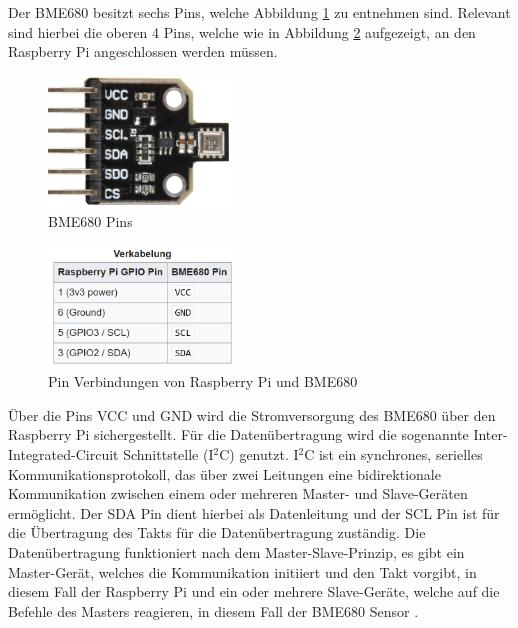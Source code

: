 \documentclass[conference]{IEEEtran}
\begin{document}
Der BME680 besitzt sechs Pins, welche Abbildung \ref{bme_pins} zu entnehmen sind. Relevant sind hierbei die oberen 4 Pins, welche wie in Abbildung \ref{verkabelung_bme} aufgezeigt, an den Raspberry Pi angeschlossen werden müssen. \cite{bme_anschluss}
\begin{figure}[H]
	\centering
	\includegraphics[width=50mm]{fig/bme_pins.png}
	\caption{BME680 Pins}
	\label{bme_pins}
\end{figure}
\begin{figure}[H]
	\centerline{\includegraphics[width=50mm]{fig/verkabelung_bme.png}}
	\caption{Pin Verbindungen von Raspberry Pi und BME680 \cite{bmeAbbildungen}}
	\label{verkabelung_bme}
\end{figure}
Über die Pins VCC und GND wird die Stromversorgung des BME680 über den Raspberry Pi sichergestellt. Für die Datenübertragung wird die sogenannte Inter-Integrated-Circuit Schnittstelle (I$^2$C) genutzt. I$^2$C ist ein synchrones, serielles Kommunikationsprotokoll, das über zwei Leitungen eine bidirektionale Kommunikation zwischen einem oder mehreren Master- und Slave-Geräten ermöglicht. Der SDA Pin dient hierbei als Datenleitung und der SCL Pin ist für die Übertragung des Takts für die Datenübertragung zuständig. Die Datenübertragung funktioniert nach dem Master-Slave-Prinzip, es gibt ein Master-Gerät, welches die Kommunikation initiiert und den Takt vorgibt, in diesem Fall der Raspberry Pi und ein oder mehrere Slave-Geräte, welche auf die Befehle des Masters reagieren, in diesem Fall der BME680 Sensor \cite{i2cDoc}. \\
\end{document}
